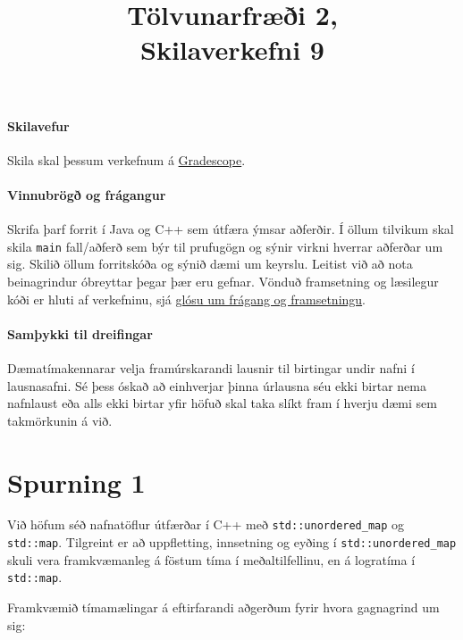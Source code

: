 \documentclass{article}
\title{Tölvunarfræði 2, \semester \\ Skilaverkefni 9}
\author{}
\begin{document}
\maketitle
{}

\paragraph{Skilavefur} Skila skal þessum verkefnum á \href{https://gradescope.com/courses/5640}{Gradescope}.

\paragraph{Vinnubrögð og frágangur} Skrifa þarf forrit í Java og C++ sem útfæra ýmsar aðferðir. Í öllum tilvikum skal skila \texttt{main} fall/aðferð sem býr til prufugögn og sýnir virkni hverrar aðferðar um sig. Skilið öllum forritskóða og sýnið dæmi um keyrslu. Leitist við að nota beinagrindur óbreyttar þegar þær eru gefnar. Vönduð framsetning og læsilegur kóði er hluti af verkefninu, sjá \href{https://piazza.com/class/ixkicfen49l111?cid=52}{glósu um frágang og framsetningu}.

\paragraph{Samþykki til dreifingar} Dæmatímakennarar velja framúrskarandi lausnir til birtingar undir nafni í lausnasafni. Sé þess óskað að einhverjar þinna úrlausna séu ekki birtar nema nafnlaust eða alls ekki birtar yfir höfuð skal taka slíkt fram í hverju dæmi sem takmörkunin á við.

\section{Spurning 1}
Við höfum séð nafnatöflur útfærðar í C++ með \texttt{std::unordered\_map} og \texttt{std::map}. Tilgreint er að uppfletting, innsetning og eyðing í \texttt{std::unordered\_map} skuli vera framkvæmanleg á föstum tíma í meðaltilfellinu, en á logratíma í \texttt{std::map}.

Framkvæmið tímamælingar á eftirfarandi aðgerðum fyrir hvora gagnagrind um sig:
\end{document}
